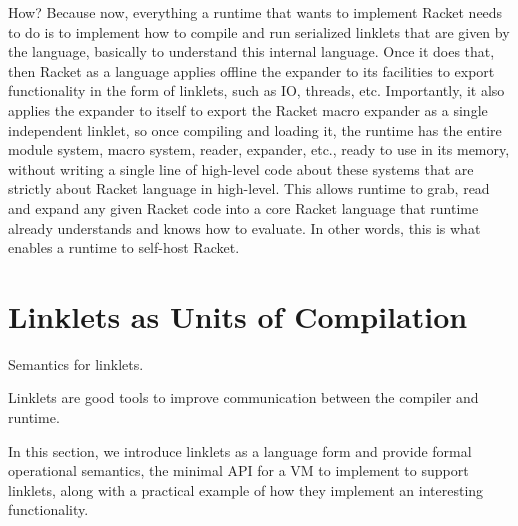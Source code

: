 		\begin{paragraph-here}
			How? Because now, everything a runtime that wants to implement Racket needs to do is to implement how to compile and run serialized linklets that are given by the language, basically to understand this internal language. Once it does that, then Racket as a language applies offline the expander to its facilities to export functionality in the form of linklets, such as IO, threads, etc. Importantly, it also applies the expander to itself to export the Racket macro expander as a single independent linklet, so once compiling and loading it, the runtime has the entire module system, macro system, reader, expander, etc., ready to use in its memory, without writing a single line of high-level code about these systems that are strictly about Racket language in high-level. This allows runtime to grab, read and expand any given Racket code into a core Racket language that runtime already understands and knows how to evaluate. In other words, this is what enables a runtime to self-host Racket.
		\end{paragraph-here}


	\section[\texorpdfstring{Linklets as Units of Compilation}{Semantics for Linklets}]{Linklets as Units of Compilation}
		\label{section:linklet-semantics}

		\begin{mainpoint}
			Semantics for linklets.

			Linklets are good tools to improve communication between the compiler and runtime.
		\end{mainpoint}

		\begin{paragraph-here}
			In this section, we introduce linklets as a language form and provide formal operational semantics, the minimal API for a VM to implement to support linklets, along with a practical example of how they implement an interesting functionality.
		\end{paragraph-here}


